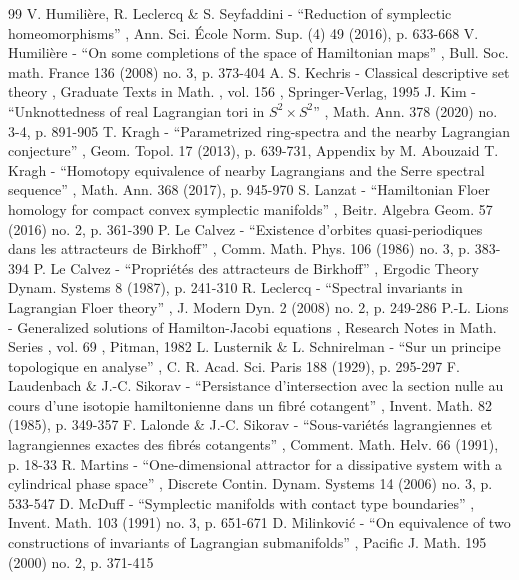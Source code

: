 \begin{thebibliography}{99}
 V. Humilière, R. Leclercq \& S. Seyfaddini - “Reduction of symplectic homeomorphisms” , Ann. Sci. École Norm. Sup. (4) 49 (2016), p. 633-668
 V. Humilière - “On some completions of the space of Hamiltonian maps” , Bull. Soc. math. France 136 (2008) no. 3, p. 373-404
 A. S. Kechris - Classical descriptive set theory , Graduate Texts in Math. , vol. 156 , Springer-Verlag, 1995
 J. Kim - “Unknottedness of real Lagrangian tori in $S^2 \times S^2$” , Math. Ann. 378 (2020) no. 3-4, p. 891-905
 T. Kragh - “Parametrized ring-spectra and the nearby Lagrangian conjecture” , Geom. Topol. 17 (2013), p. 639-731, Appendix by M. Abouzaid
 T. Kragh - “Homotopy equivalence of nearby Lagrangians and the Serre spectral sequence” , Math. Ann. 368 (2017), p. 945-970
 S. Lanzat - “Hamiltonian Floer homology for compact convex symplectic manifolds” , Beitr. Algebra Geom. 57 (2016) no. 2, p. 361-390
 P. Le Calvez - “Existence d’orbites quasi-periodiques dans les attracteurs de Birkhoff” , Comm. Math. Phys. 106 (1986) no. 3, p. 383-394
 P. Le Calvez - “Propriétés des attracteurs de Birkhoff” , Ergodic Theory Dynam. Systems 8 (1987), p. 241-310
 R. Leclercq - “Spectral invariants in Lagrangian Floer theory” , J. Modern Dyn. 2 (2008) no. 2, p. 249-286
 P.-L. Lions - Generalized solutions of Hamilton-Jacobi equations , Research Notes in Math. Series , vol. 69 , Pitman, 1982
 L. Lusternik \& L. Schnirelman - “Sur un principe topologique en analyse” , C. R. Acad. Sci. Paris 188 (1929), p. 295-297
 F. Laudenbach \& J.-C. Sikorav - “Persistance d’intersection avec la section nulle au cours d’une isotopie hamiltonienne dans un fibré cotangent” , Invent. Math. 82 (1985), p. 349-357
 F. Lalonde \& J.-C. Sikorav - “Sous-variétés lagrangiennes et lagrangiennes exactes des fibrés cotangents” , Comment. Math. Helv. 66 (1991), p. 18-33
 R. Martins - “One-dimensional attractor for a dissipative system with a cylindrical phase space” , Discrete Contin. Dynam. Systems 14 (2006) no. 3, p. 533-547
 D. McDuff - “Symplectic manifolds with contact type boundaries” , Invent. Math. 103 (1991) no. 3, p. 651-671
 D. Milinković - “On equivalence of two constructions of invariants of Lagrangian submanifolds” , Pacific J. Math. 195 (2000) no. 2, p. 371-415

\end{thebibliography}

